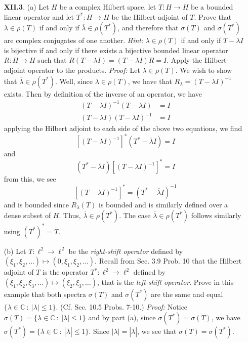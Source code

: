 \documentclass{article}
\begin{document}
\begin{itemize}
    \pagebreak
    \item[\textbf{XII.3}.] (a) Let $H$ be a complex Hilbert space, let $T: H \to H$ be a bounded linear operator and let $T^*: H \to H$ be the Hilbert-adjoint of $T$. Prove that $\lambda \in \rho(T)$ if and only if $\overline{\lambda} \in \rho(T^*)$, and therefore that $\sigma(T)$ and $\sigma(T^*)$ are complex conjugates of one another.
    \newline
    \textit{Hint}: $\lambda \in \rho(T)$ if and only if $T - \lambda I $ is bijective if and only if there exists a bijective bounded linear operator $R: H \to H$ such that $R(T - \lambda I) = (T - \lambda I)R = I$. Apply the Hilbert-adjoint operator to the products.
    \newline\newline
    \textit{Proof:} Let $\lambda \in \rho(T)$. We wish to show that $\overline{\lambda} \in \rho(T^*)$. Well, since $\lambda \in \rho(T)$, we have that $R_{\lambda} = (T - \lambda I)^{-1}$ exists. Then by definition of the inverse of an operator, we have
    \begin{align*}
        (T - \lambda I)^{-1}(T - \lambda I) &= I\\
        (T - \lambda I)(T - \lambda I)^{-1} &= I
    \end{align*}
    applying the Hilbert adjoint to each side of the above two equations, we find
    \[[(T - \lambda I)^{-1}]^*(T^* - \overline{\lambda} I) = I\]
    and 
    \[(T^* - \overline{\lambda} I )[(T - \lambda I)^{-1}]^* = I\]
    from this, we see
    \[[(T - \lambda I)^{-1}]^* = (T^* - \overline{\lambda} I)^{-1}\]
    and is bounded since $R_{\lambda}(T)$ is bounded and is similarly defined over a dense subset of $H$. Thus, $\overline{\lambda} \in \rho(T^*)$.
    \newline\newline
    The case $\overline{\lambda} \in \rho(T^*)$ follows similarly using $(T^*)^* = T$.
    \newline\newline
    

    
    (b) Let $T: \ell^2 \to \ell^2$ be the \textit{right-shift operator} defined by $(\xi_1, \xi_2,\dots) \mapsto (0, \xi_1, \xi_2,\dots)$. Recall from Sec. 3.9 Prob. 10 that the Hilbert adjoint of $T$ is the operator $T^* : \ell^2 \to \ell^2$ defined by $(\xi_1, \xi_2,\xi_3, \dots) \mapsto (\xi_2, \xi_3,\dots)$, that is the \textit{left-shift operator}. Prove in this example that both spectra $\sigma(T)$ and $\sigma(T^*)$ are the same and equal $\{\lambda \in \mathbb{C} \: : \: |\lambda| \leq 1\}$. (Cf. Sec. 10.5 Probs. 7-10.)
    \newline\newline
    \textit{Proof:}
    Notice $\sigma(T) = \{\lambda \in \mathbb{C} \: : \: |\lambda| \leq 1\}$ and by part (a), since $\sigma(T^*) = \overline{\sigma(T)}$, we have $\sigma(T^*) = \{\overline{\lambda} \in \mathbb{C} \: : \: |\overline{\lambda}| \leq 1\}$. Since $|\lambda| = |\overline{\lambda}|$, we see that $\sigma(T) = \sigma(T^*)$.
\end{itemize}
\end{document}
